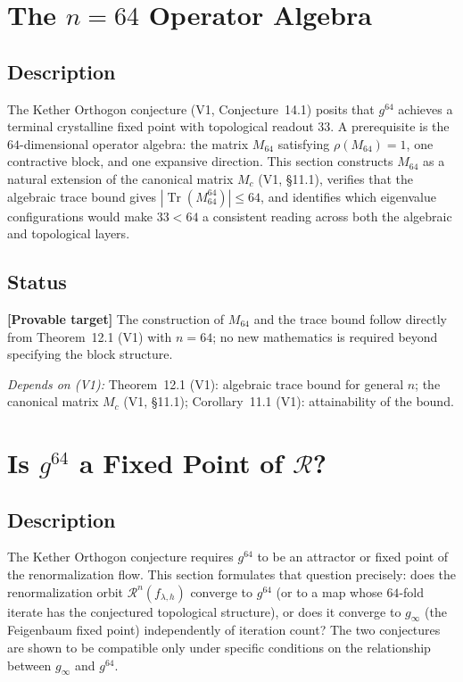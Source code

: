 \documentclass[11pt]{article}
\newcommand{\provable}{\textcolor{blue!70!black}{\textbf{[Provable target]}}}
\newcommand{\depends}[1]{\smallskip\noindent\textit{Depends on (V1):} #1.\smallskip}
\begin{document}
\section{The $n = 64$ Operator Algebra}

\subsection*{Description}
The Kether Orthogon conjecture (V1, Conjecture~14.1) posits that $g^{64}$
achieves a terminal crystalline fixed point with topological readout $33$.
A prerequisite is the $64$-dimensional operator algebra: the matrix
$M_{64}$ satisfying $\rho(M_{64}) = 1$, one contractive block, and one
expansive direction. This section constructs $M_{64}$ as a natural
extension of the canonical matrix $M_c$ (V1, \S11.1), verifies that the
algebraic trace bound gives $|\operatorname{Tr}(M_{64}^{64})| \le 64$, and
identifies which eigenvalue configurations would make $33 < 64$ a
consistent reading across both the algebraic and topological layers.

\subsection*{Status}
\provable{} The construction of $M_{64}$ and the trace bound follow
directly from Theorem~12.1 (V1) with $n = 64$; no new mathematics is
required beyond specifying the block structure.

\depends{Theorem~12.1 (V1): algebraic trace bound for general $n$;
the canonical matrix $M_c$ (V1, \S11.1);
Corollary~11.1 (V1): attainability of the bound}

\section{Is $g^{64}$ a Fixed Point of $\mathcal{R}$?}

\subsection*{Description}
The Kether Orthogon conjecture requires $g^{64}$ to be an attractor or
fixed point of the renormalization flow. This section formulates that
question precisely: does the renormalization orbit $\mathcal{R}^n(f_{\lambda,h})$
converge to $g^{64}$ (or to a map whose $64$-fold iterate has the conjectured
topological structure), or does it converge to $g_\infty$ (the Feigenbaum
fixed point) independently of iteration count? The two conjectures are
shown to be compatible only under specific conditions on the relationship
between $g_\infty$ and $g^{64}$.
\end{document}
